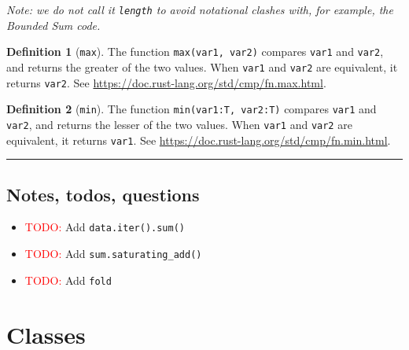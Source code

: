 \documentclass[11pt,a4paper]{article}
\theoremstyle{definition}
\newtheorem{definition}{Definition}[section]
\newcommand{\horizline}{\noindent\rule{\textwidth}{1pt}}
\newcommand{\inRust}[2]{See \url{#2}.}
\newcommand{\todo}{{\textcolor{red}{TODO: }}}
\begin{document}
\emph{Note: we do not call it \texttt{length} to avoid notational clashes with, for example, the Bounded Sum code.}

\begin{definition}[\texttt{max}]
    The function \texttt{max(var1, var2)} compares \texttt{var1} and \texttt{var2}, and returns the greater of the two values. When \texttt{var1} and \texttt{var2} are equivalent, it returns \texttt{var2}. \inRust{std::cmp::max}{https://doc.rust-lang.org/std/cmp/fn.max.html}
\end{definition}

\begin{definition}[\texttt{min}]
    The function \texttt{min(var1:T, var2:T)} compares \texttt{var1} and \texttt{var2}, and returns the lesser of the two values. When \texttt{var1} and \texttt{var2} are equivalent, it returns \texttt{var1}. \inRust{std::cmp::min}{https://doc.rust-lang.org/std/cmp/fn.min.html}
\end{definition}

\horizline

\subsection{Notes, todos, questions}

\begin{itemize}
    \item \todo{Add \texttt{data.iter().sum()}}
    \item \todo{Add \texttt{sum.saturating\_add()}}
    \item \todo{Add \texttt{fold}}
\end{itemize}

\section{Classes}
\end{document}
